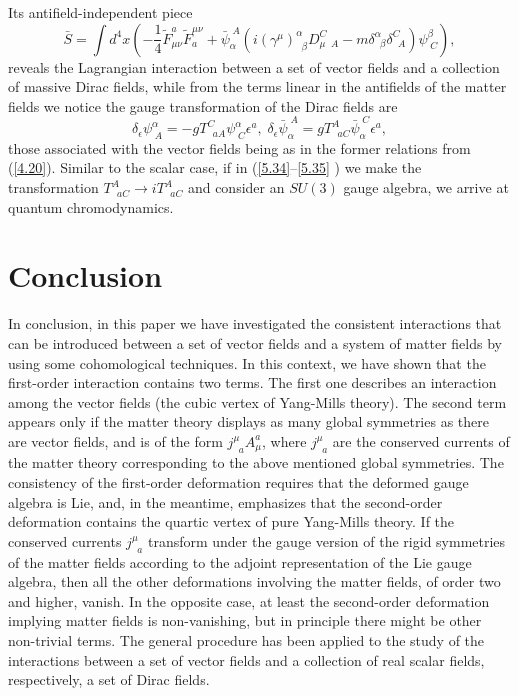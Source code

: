 \documentclass[a4paper,12pt]{article}
\begin{document}
Its antifield-independent piece
\begin{equation}
\bar{S}=\int d^{4}x\left( -
\frac{1}{4}\tilde{F}_{\mu \nu }^{a}\tilde{F}%
_{a}^{\mu \nu }+
\bar{\psi}_{\alpha }^{\;A}\left( i\left( \gamma ^{\mu
}\right) _{\;\;\beta }^{\alpha }D_{\mu \;\;A}^{C}-
m\delta _{\;\;\beta
}^{\alpha }\delta _{\;\;A}^{C}\right)
\psi _{\;C}^{\beta }\right) ,
\label{5.34}
\end{equation}
reveals the Lagrangian interaction
between a set of vector fields and a
collection of massive Dirac fields,
while from the terms linear in the
antifields of the matter fields we
notice the gauge transformation of the
Dirac fields are
\begin{equation}
\delta _{\epsilon }\psi _{\;A}^{\alpha }=
-gT_{\;\;aA}^{C}\psi _{\;C}^{\alpha
}\epsilon ^{a},\;\delta _{\epsilon }
\bar{\psi}_{\alpha
}^{\;A}=gT_{\;\;aC}^{A}
\bar{\psi}_{\alpha }^{\;C}\epsilon ^{a},  \label{5.35}
\end{equation}
those associated with the vector
fields being as in the former relations
from (\ref{4.20}). Similar to the
scalar case, if in (\ref{5.34}--\ref{5.35}%
) we make the transformation
$T_{\;\;aC}^{A}\rightarrow iT_{\;\;aC}^{A}$ and
consider an $SU\left( 3\right) $
gauge algebra, we arrive at quantum
chromodynamics.

\section{Conclusion}

In conclusion, in this paper we
have investigated the consistent
interactions that can be introduced
between a set of vector fields and a
system of matter fields by using some
cohomological techniques. In this
context, we have shown that the
first-order interaction contains two terms.
The first one describes an interaction
among the vector fields (the cubic
vertex of Yang-Mills theory). The
second term appears only if the matter
theory displays as many global
symmetries as there are vector fields, and is
of the form $j_{\;\;a}^{\mu }A_{\mu }^{a}$,
where $j_{\;\;a}^{\mu }$ are the
conserved currents of the matter theory
corresponding to the above mentioned
global symmetries. The consistency of
the first-order deformation requires
that the deformed gauge algebra is Lie,
and, in the meantime, emphasizes
that the second-order deformation
contains the quartic vertex of pure
Yang-Mills theory. If the conserved
currents $j_{\;\;a}^{\mu }$ transform
under the gauge version of the rigid
symmetries of the matter fields
according to the adjoint representation
of the Lie gauge algebra, then all
the other deformations involving the matter
fields, of order two and higher,
vanish. In the opposite case, at least the
second-order deformation implying
matter fields is non-vanishing, but in
principle there might be other
non-trivial terms. The general procedure
has been applied to the study of
the interactions between a set of vector
fields and a collection of real
scalar fields, respectively, a set
of Dirac fields.
\end{document}
